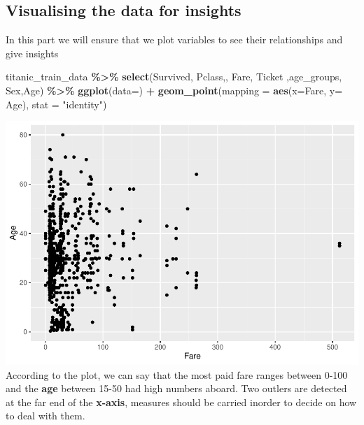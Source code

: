 \documentclass[
]{article}
\newenvironment{Shaded}{\begin{snugshade}}{\end{snugshade}}
\newcommand{\AttributeTok}[1]{\textcolor[rgb]{0.13,0.29,0.53}{#1}}
\newcommand{\CommentTok}[1]{\textcolor[rgb]{0.56,0.35,0.01}{\textit{#1}}}
\newcommand{\FunctionTok}[1]{\textcolor[rgb]{0.13,0.29,0.53}{\textbf{#1}}}
\newcommand{\NormalTok}[1]{#1}
\newcommand{\OtherTok}[1]{\textcolor[rgb]{0.56,0.35,0.01}{#1}}
\newcommand{\SpecialCharTok}[1]{\textcolor[rgb]{0.81,0.36,0.00}{\textbf{#1}}}
\newcommand{\StringTok}[1]{\textcolor[rgb]{0.31,0.60,0.02}{#1}}
\begin{document}
\begin{Shaded}
\end{Shaded}

\hypertarget{visualising-the-data-for-insights}{%
\subsection{Visualising the data for
insights}\label{visualising-the-data-for-insights}}

In this part we will ensure that we plot variables to see their
relationships and give insights

\begin{Shaded}
\begin{Highlighting}[]
\NormalTok{titanic\_train\_data }\SpecialCharTok{\%\textgreater{}\%}
  \FunctionTok{select}\NormalTok{(Survived, Pclass,, Fare, Ticket ,age\_groups, Sex,Age) }\SpecialCharTok{\%\textgreater{}\%}
  \FunctionTok{ggplot}\NormalTok{(}\AttributeTok{data=}\NormalTok{) }\SpecialCharTok{+} 
  \FunctionTok{geom\_point}\NormalTok{(}\AttributeTok{mapping =}  \FunctionTok{aes}\NormalTok{(}\AttributeTok{x=}\NormalTok{Fare, }\AttributeTok{y=}\NormalTok{ Age), }\AttributeTok{stat =} \StringTok{"identity"}\NormalTok{)}
\end{Highlighting}
\end{Shaded}

\includegraphics{Titanic-Documentation_files/figure-latex/unnamed-chunk-24-1.pdf}
According to the plot, we can say that the most paid fare ranges between
0-100 and the \textbf{age} between 15-50 had high numbers aboard. Two
outlers are detected at the far end of the \textbf{x-axis}, measures
should be carried inorder to decide on how to deal with them.
\end{document}
